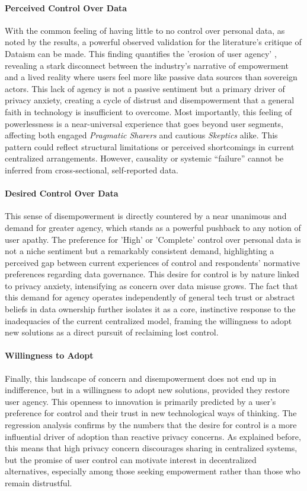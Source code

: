 	\paragraph{Perceived Control Over Data}
	With the common feeling of having little to no control over personal data, as noted by the results, a powerful observed validation for the literature's critique of Dataism can be made. This finding quantifies the 'erosion of user agency' \cite{VanDijck2014}, revealing a stark disconnect between the industry's narrative of empowerment and a lived reality where users feel more like passive data sources than sovereign actors. This lack of agency is not a passive sentiment but a primary driver of privacy anxiety, creating a cycle of distrust and disempowerment that a general faith in technology is insufficient to overcome. Most importantly, this feeling of powerlessness is a near-universal experience that goes beyond user segments, affecting both engaged \textit{Pragmatic Sharers} and cautious \textit{Skeptics} alike. This pattern could reflect structural limitations or perceived shortcomings in current centralized arrangements. However, causality or systemic “failure” cannot be inferred from cross‑sectional, self‑reported data.

	\paragraph{Desired Control Over Data}
	This sense of disempowerment is directly countered by a near unanimous and demand for greater agency, which stands as a powerful pushback to any notion of user apathy. The preference for 'High' or 'Complete' control over personal data is not a niche sentiment but a remarkably consistent demand, highlighting a perceived gap between current experiences of control and respondents’ normative preferences regarding data governance. This desire for control is by nature linked to privacy anxiety, intensifying as concern over data misuse grows. The fact that this demand for agency operates independently of general tech trust or abstract beliefs in data ownership further isolates it as a core, instinctive response to the inadequacies of the current centralized model, framing the willingness to adopt new solutions as a direct pursuit of reclaiming lost control.

	\paragraph{Willingness to Adopt}
	Finally, this landscape of concern and disempowerment does not end up in indifference, but in a willingness to adopt new solutions, provided they restore user agency. This openness to innovation is primarily predicted by a user's preference for control and their trust in new technological ways of thinking. The regression analysis confirms by the numbers that the desire for control is a more influential driver of adoption than reactive privacy concerns. As explained before, this means that high privacy concern discourages sharing in centralized systems, but the promise of user control can motivate interest in decentralized alternatives, especially among those seeking empowerment rather than those who remain distrustful. 
